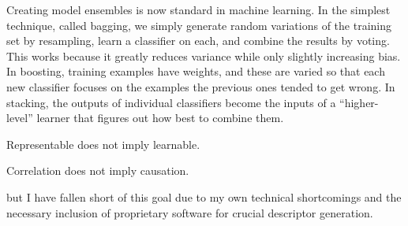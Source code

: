 Creating model ensembles is now standard in machine learning. In the simplest technique, called bagging, we simply generate random variations of the training set by resampling, learn a classifier on each, and combine the results by voting. This works because it greatly reduces variance while only slightly increasing bias. In boosting, training examples have weights, and these are varied so that each new classifier focuses on the examples the previous ones tended to get wrong. In stacking, the outputs of individual classifiers become the inputs of a “higher-level” learner that figures out how best to combine them.\cite{Domingos2012}

Representable does not imply learnable.\cite{Domingos2012}

Correlation does not imply causation.\cite{Domingos2012}


but I have fallen short of this goal due to my own technical shortcomings and the necessary inclusion of proprietary software for crucial descriptor generation.